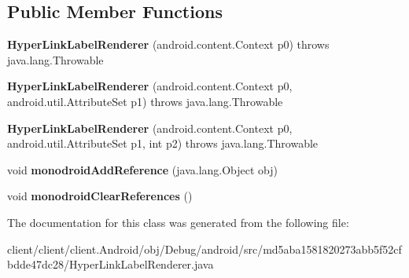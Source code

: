 \subsection*{Public Member Functions}
\begin{DoxyCompactItemize}
\item 
\hypertarget{classmd5aba1581820273abb5f52cfbdde47dc28_1_1HyperLinkLabelRenderer_ab05d9d2cfd809b3719de7884b3ca2b9b}{}{\bfseries Hyper\+Link\+Label\+Renderer} (android.\+content.\+Context p0)  throws java.\+lang.\+Throwable 	\label{classmd5aba1581820273abb5f52cfbdde47dc28_1_1HyperLinkLabelRenderer_ab05d9d2cfd809b3719de7884b3ca2b9b}

\item 
\hypertarget{classmd5aba1581820273abb5f52cfbdde47dc28_1_1HyperLinkLabelRenderer_a116b87ad771d16198d8c6ff79dfdc7c3}{}{\bfseries Hyper\+Link\+Label\+Renderer} (android.\+content.\+Context p0, android.\+util.\+Attribute\+Set p1)  throws java.\+lang.\+Throwable 	\label{classmd5aba1581820273abb5f52cfbdde47dc28_1_1HyperLinkLabelRenderer_a116b87ad771d16198d8c6ff79dfdc7c3}

\item 
\hypertarget{classmd5aba1581820273abb5f52cfbdde47dc28_1_1HyperLinkLabelRenderer_a77ce209b7940a7d8948bd0eac0e95c4f}{}{\bfseries Hyper\+Link\+Label\+Renderer} (android.\+content.\+Context p0, android.\+util.\+Attribute\+Set p1, int p2)  throws java.\+lang.\+Throwable 	\label{classmd5aba1581820273abb5f52cfbdde47dc28_1_1HyperLinkLabelRenderer_a77ce209b7940a7d8948bd0eac0e95c4f}

\item 
\hypertarget{classmd5aba1581820273abb5f52cfbdde47dc28_1_1HyperLinkLabelRenderer_ac9c1e6b2a5fb4dccd06c5b8b4437ef07}{}void {\bfseries monodroid\+Add\+Reference} (java.\+lang.\+Object obj)\label{classmd5aba1581820273abb5f52cfbdde47dc28_1_1HyperLinkLabelRenderer_ac9c1e6b2a5fb4dccd06c5b8b4437ef07}

\item 
\hypertarget{classmd5aba1581820273abb5f52cfbdde47dc28_1_1HyperLinkLabelRenderer_a1baaeaf0225240d319d9bbe61875577d}{}void {\bfseries monodroid\+Clear\+References} ()\label{classmd5aba1581820273abb5f52cfbdde47dc28_1_1HyperLinkLabelRenderer_a1baaeaf0225240d319d9bbe61875577d}

\end{DoxyCompactItemize}


The documentation for this class was generated from the following file\+:\begin{DoxyCompactItemize}
\item 
client/client/client.\+Android/obj/\+Debug/android/src/md5aba1581820273abb5f52cfbdde47dc28/Hyper\+Link\+Label\+Renderer.\+java\end{DoxyCompactItemize}
